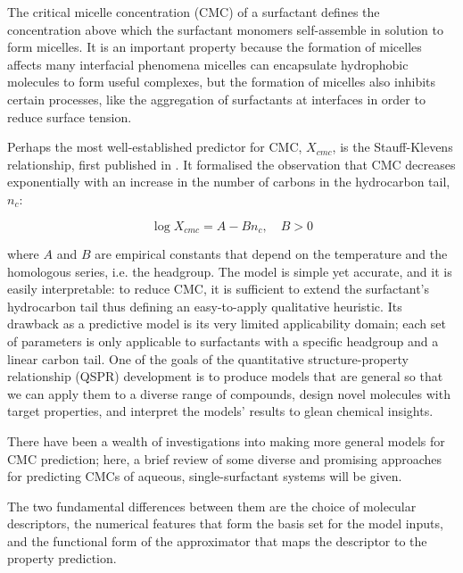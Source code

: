 The critical micelle concentration (CMC) of a surfactant defines the concentration above which the surfactant monomers self-assemble in solution to form micelles. It is an important property because the formation of micelles affects many interfacial phenomena \cite{rosenSurfactantsInterfacialPhenomena2012} micelles can encapsulate hydrophobic molecules to form useful complexes, but the formation of micelles also inhibits certain processes, like the aggregation of surfactants at interfaces in order to reduce surface tension.

Perhaps the most well-established predictor for CMC, $X_{cmc}$, is the Stauff-Klevens relationship, first published in \citeyear{klevensStructureAggregationDilate1953} \cite{klevensStructureAggregationDilate1953}. It formalised the observation that CMC decreases exponentially with an increase in the number of carbons in the hydrocarbon tail, $n_c$:

\begin{equation}
    \label{eq:klevens}
    \log X_{cmc} = A - Bn_c, \quad B > 0
\end{equation}

where $A$ and $B$ are empirical constants that depend on the temperature and the homologous series, i.e. the headgroup. The model is simple yet accurate, and it is easily interpretable: to reduce CMC, it is sufficient to extend the surfactant's hydrocarbon tail thus defining an easy-to-apply qualitative heuristic. Its drawback as a predictive model is its very limited applicability domain; each set of parameters is only applicable to surfactants with a specific headgroup and a linear carbon tail.
One of the goals of the quantitative structure-property relationship (QSPR) development is to produce models that are general so that we can apply them to a diverse range of compounds, design novel molecules with target properties, and
interpret the models' results to glean chemical insights.

There have been a wealth of investigations into making more general models for
CMC prediction; here, a brief review of some diverse and promising approaches
for predicting CMCs of aqueous, single-surfactant systems will be given.



The two fundamental differences between them are the choice of molecular
descriptors, the numerical features that form the basis set for the model
inputs, and the functional form of the approximator that maps the descriptor to
the property prediction. 

